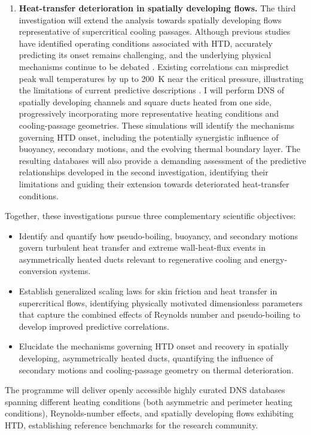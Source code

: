 \documentclass[11pt]{article}
\begin{document}
\begin{enumerate}
	\item \textbf{Heat-transfer deterioration in spatially developing flows.}
	The third investigation will extend the analysis towards spatially developing flows representative of supercritical cooling passages.
	Although previous studies have identified operating conditions associated with HTD, accurately predicting its onset remains challenging, and the underlying physical mechanisms continue to be debated \cite{Nasuti2021,Li2025}.
	Existing correlations can mispredict peak wall temperatures by up to 200~K near the critical pressure, illustrating the limitations of current predictive descriptions \cite{Nasuti2021}.
	I will perform DNS of spatially developing channels and square ducts heated from one side, progressively incorporating more representative heating conditions and cooling-passage geometries.
	These simulations will identify the mechanisms governing HTD onset, including the potentially synergistic influence of buoyancy, secondary motions, and the evolving thermal boundary layer.
	The resulting databases will also provide a demanding assessment of the predictive relationships developed in the second investigation, identifying their limitations and guiding their extension towards deteriorated heat-transfer conditions.
\end{enumerate}
Together, these investigations pursue three complementary scientific objectives:
\begin{itemize}
	\item[\textbf{O1.}] Identify and quantify how pseudo-boiling, buoyancy, and secondary motions govern turbulent heat transfer and extreme wall-heat-flux events in asymmetrically heated ducts relevant to regenerative cooling and energy-conversion systems.
	
	\item[\textbf{O2.}] Establish generalized scaling laws for skin friction and heat transfer in supercritical flows, identifying physically motivated dimensionless parameters that capture the combined effects of Reynolds number and pseudo-boiling to develop improved predictive correlations.
	
	\item[\textbf{O3.}] Elucidate the mechanisms governing HTD onset and recovery in spatially developing, asymmetrically heated ducts, quantifying the influence of secondary motions and cooling-passage geometry on thermal deterioration.
\end{itemize}
The programme will deliver openly accessible highly curated DNS databases spanning different heating conditions (both asymmetric and perimeter heating conditions), Reynolds-number effects, and spatially developing flows exhibiting HTD, establishing reference benchmarks for the research community.
\end{document}
